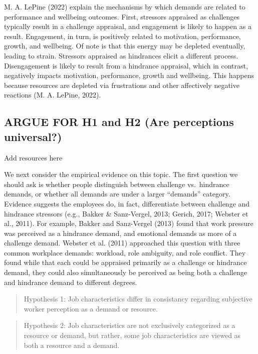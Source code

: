 \documentclass[
  jou,mask]{apa6}
\begin{document}
M. A. LePine (2022) explain the mechanisms by which demands are related to performance and wellbeing outcomes. First, stressors appraised as challenges typically result in a challenge appraisal, and engagement is likely to happen as a result. Engagement, in turn, is positively related to motivation, performance, growth, and wellbeing. Of note is that this energy may be depleted eventually, leading to strain. Stressors appraised as hindrances elicit a different process. Disengagement is likely to result from a hindrance appraisal, which in contrast, negatively impacts motivation, performance, growth and wellbeing. This happens because resources are depleted via frustrations and other affectively negative reactions (M. A. LePine, 2022).

\hypertarget{argue-for-h1-and-h2-are-perceptions-universal}{%
\subsection{ARGUE FOR H1 and H2 (Are perceptions universal?)}\label{argue-for-h1-and-h2-are-perceptions-universal}}

Add resources here

We next consider the empirical evidence on this topic. The first question we should ask is whether people distinguish between challenge vs.~hindrance demands, or whether all demands are under a larger ``demands'' category. Evidence suggests the employees do, in fact, differentiate between challenge and hindrance stressors (e.g., Bakker \& Sanz-Vergel, 2013; Gerich, 2017; Webster et al., 2011). For example, Bakker and Sanz-Vergel (2013) found that work pressure was perceived as a hindrance demand, and emotional demands as more of a challenge demand. Webster et al. (2011) approached this question with three common workplace demands: workload, role ambiguity, and role conflict. They found while that each could be appraised primarily as a challenge or hindrance demand, they could also simultaneously be perceived as being both a challenge and hindrance demand to different degrees.

\begin{quote}
Hypothesis 1: Job characteristics differ in consistancy regarding subjective worker perception as a demand or resource.
\end{quote}

\begin{quote}
Hypothesis 2: Job characteristics are not exclusively categorized as a resource or demand, but rather, some job characteristics are viewed as both a resource and a demand.
\end{quote}
\end{document}
